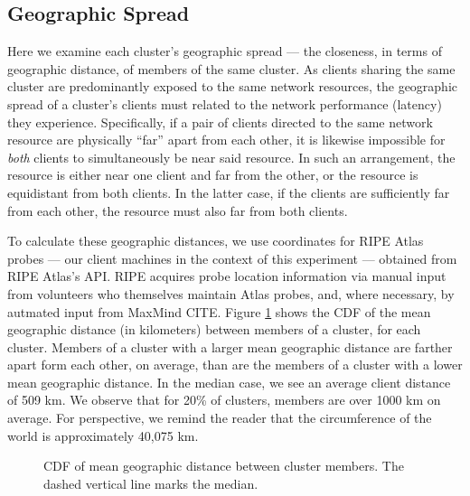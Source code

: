 \subsection{Geographic Spread}
\label{sect:geospread}

Here we examine each cluster's geographic spread --- the closeness, in terms of
geographic distance, of members of the same cluster. As clients sharing the same
cluster are predominantly exposed to the same network resources, the geographic
spread of a cluster's clients must related to the network performance (latency)
they experience. Specifically, if a pair of clients directed
to the same network resource are physically ``far'' apart from each other, it is
likewise impossible for \emph{both} clients to simultaneously be near said
resource. In such an arrangement, the resource is either near one client and far from the other, or the
resource is equidistant from both clients. In the latter case, if the clients
are sufficiently far from each other, the resource must also far from both clients.

To calculate these geographic distances, we use coordinates for RIPE Atlas
probes --- our client machines in the context of this experiment --- obtained
from RIPE Atlas's API. RIPE acquires probe location information via manual input
from volunteers who themselves maintain Atlas probes, and, where necessary, by
autmated input from MaxMind CITE. Figure \ref{geomeans} shows the CDF of the
mean geographic distance (in kilometers) between members of a cluster, for each
cluster. Members of a cluster with a larger mean geographic distance are farther
apart form each other, on average, than are the members of a cluster with a
lower mean geographic distance. In the median case, we see an average client
distance of 509 km. We observe that for 20\% of clusters, members are over 1000
km on average. For perspective, we remind the reader that the circumference of
the world is approximately 40,075 km. 

\begin{figure}
    \caption{CDF of mean geographic distance between
    cluster members. The dashed vertical line marks the median.}
    \label{geomeans}
\end{figure}

